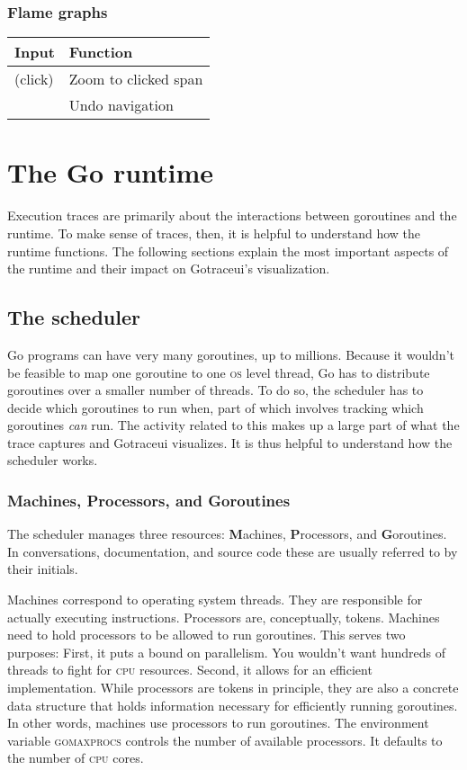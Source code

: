 \documentclass[10pt,letterpaper,oneside,openany,english]{memoir}
\newcommand{\code}[1]{{\ttfamily\mbox{#1}}}
\newcommand{\shortcut}{\ctrl{} or \cmdmac}
\newenvironment{keybindings}{%
\begingroup
\def\arraystretch{1.5}%
\begin{tabular}{ll}
  Input & Function \\
  \hline
}{%
\end{tabular}
\endgroup
}
\begin{document}
\subsection*{Flame graphs}

\begin{keybindings}
  \keys{\shortcut + LMB} (click) & Zoom to clicked span \\
  \keys{\shortcut + Z} & Undo navigation
\end{keybindings}

\chapter{The Go runtime}

Execution traces are primarily about the interactions between goroutines and the runtime.
To make sense of traces, then, it is helpful to understand how the runtime functions.
The following sections explain the most important aspects of the runtime and their impact on Gotraceui's visualization.

\section{The scheduler}
Go programs can have very many goroutines, up to millions.
Because it wouldn't be feasible to map one goroutine to one \textsc{os} level thread,
Go has to distribute goroutines over a smaller number of threads.
To do so, the scheduler has to decide which goroutines to run when,
part of which involves tracking which goroutines {\em can} run.
The activity related to this makes up a large part of what the trace captures and Gotraceui visualizes.
It is thus helpful to understand how the scheduler works.

\subsection{Machines, Processors, and Goroutines}

The scheduler manages three resources: \textbf{M}achines, \textbf{P}rocessors, and \textbf{G}oroutines.
In conversations, documentation, and source code these are usually referred to by their initials.

Machines correspond to operating system threads.
They are responsible for actually executing instructions.
Processors are, conceptually, tokens.
Machines need to hold processors to be allowed to run goroutines.
This serves two purposes:
First, it puts a bound on parallelism.
You wouldn't want hundreds of threads to fight for \textsc{cpu} resources.
Second, it allows for an efficient implementation.
While processors are tokens in principle, they are also a concrete data structure that holds information necessary for efficiently running goroutines.
In other words, machines use processors to run goroutines.
The environment variable \code{\textsc{gomaxprocs}} controls the number of available processors.
It defaults to the number of \textsc{cpu} cores.
\end{document}
